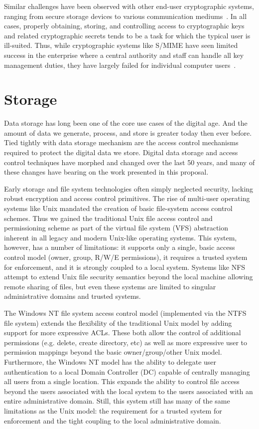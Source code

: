 Similar challenges have been observed with other end-user
cryptographic systems, ranging from secure storage devices to various
communication mediums~\cite{Sweikata2009}. In all cases, properly
obtaining, storing, and controlling access to cryptographic keys and
related cryptographic secrets tends to be a task for which the typical
user is ill-suited. Thus, while cryptographic systems like S/MIME have
seen limited success in the enterprise where a central authority and
staff can handle all key management duties, they have largely failed
for individual computer users~\cite{ramsdell-rfc5751}.

\section{Storage}

Data storage has long been one of the core use cases of the digital
age. And the amount of data we generate, process, and store is greater
today then ever before. Tied tightly with data storage mechanism are
the access control mechanisms required to protect the digital data we
store. Digital data storage and access control techniques have morphed
and changed over the last 50 years, and many of these changes have
bearing on the work presented in this proposal.

Early storage and file system technologies often simply neglected
security, lacking robust encryption and access control primitives. The
rise of multi-user operating systems like Unix mandated the creation
of basic file-system access control schemes. Thus we gained the
traditional Unix file access control and permissioning scheme as part
of the virtual file system (VFS) abstraction inherent in all legacy
and modern Unix-like operating systems. This system, however, has a
number of limitations: it supports only a single, basic access control
model (owner, group, R/W/E permissions), it requires a trusted system
for enforcement, and it is strongly coupled to a local system. Systems
like NFS attempt to extend Unix file security semantics beyond the
local machine allowing remote sharing of files, but even these systems
are limited to singular administrative domains and trusted systems.

The Windows NT file system access control model (implemented via the
NTFS file system) extends the flexibility of the traditional Unix
model by adding support for more expressive ACLs. These both allow the
control of additional permissions (e.g. delete, create directory, etc)
as well as more expressive user to permission mappings beyond the
basic owner/group/other Unix model. Furthermore, the Windows NT model
has the ability to delegate user authentication to a local Domain
Controller (DC) capable of centrally managing all users from a single
location. This expands the ability to control file access beyond the
users associated with the local system to the users associated with an
entire administrative domain. Still, this system still has many of the
same limitations as the Unix model: the requirement for a trusted
system for enforcement and the tight coupling to the local
administrative domain.


